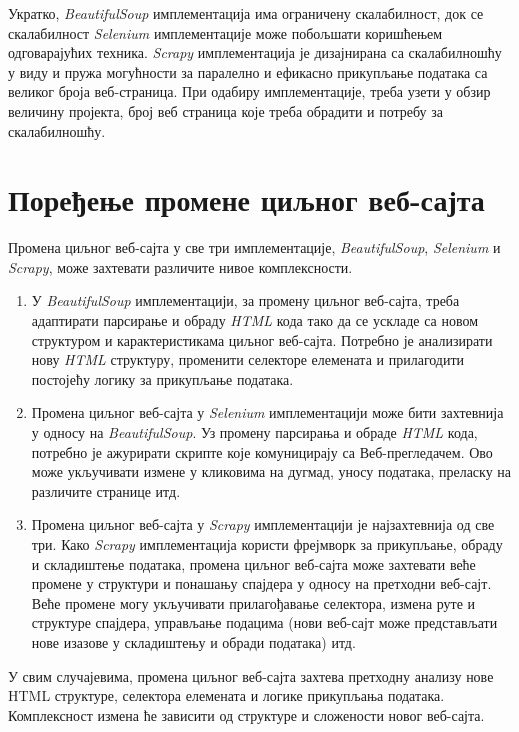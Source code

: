 \documentclass[12pt,oneside]{memoir}
\begin{document}
Укратко, \textit{BeautifulSoup} имплементација има ограничену скалабилност, док се скалабилност \textit{Selenium} имплементације може побољшати коришћењем одговарајућих техника. \textit{Scrapy} имплементација је дизајнирана са скалабилношћу у виду и пружа могућности за паралелно и ефикасно прикупљање података са великог броја веб-страница. При одабиру имплементације, треба узети у обзир величину пројекта, број веб страница које треба обрадити и потребу за скалабилношћу.

\section{Поређење промене циљног веб-сајта}
Промена циљног веб-сајта у све три имплементације, \textit{BeautifulSoup}, \textit{Selenium} и \textit{Scrapy}, може захтевати различите нивое комплексности.

\begin{enumerate}
\item У \textit{BeautifulSoup} имплементацији, за промену циљног веб-сајта, треба адаптирати парсирање и обраду \textit{HTML} кода тако да се ускладе са новом структуром и карактеристикама циљног веб-сајта. Потребно је анализирати нову \textit{HTML} структуру, променити селекторе елемената и прилагодити постојећу логику за прикупљање података.
\item Промена циљног веб-сајта у \textit{Selenium} имплементацији може бити захтевнија у односу на \textit{BeautifulSoup}. Уз промену парсирања и обраде \textit{HTML} кода, потребно је ажурирати скрипте које комуницирају са Веб-прегледачем. Ово може укључивати измене у кликовима на дугмад, уносу података, преласку на различите странице итд.
\item Промена циљног веб-сајта у \textit{Scrapy} имплементацији је најзахтевнија од све три. Како \textit{Scrapy} имплементација користи фрејмворк за прикупљање, обраду и складиштење података, промена циљног веб-сајта може захтевати веће промене у структури и понашању спајдера у односу на претходни веб-сајт. Веће промене могу укључивати прилагођавање селектора, измена руте и структуре спајдера, управљање подацима (нови веб-сајт може представљати нове изазове у складиштењу и обради података) итд.
\end{enumerate}

У свим случајевима, промена циљног веб-сајта захтева претходну анализу нове HTML структуре, селектора елемената и логике прикупљања података. Комплексност измена ће зависити од структуре и сложености новог веб-сајта.
\end{document}
